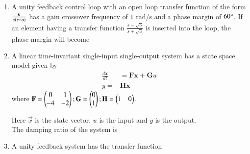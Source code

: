 \documentclass[journal,12pt,onecolumn]{IEEEtran}
\theoremstyle{remark}
\begin{document}
\begin{enumerate}
 

\item A unity feedback control loop with an open loop transfer function of the form $\frac{K}{s\left(s+a\right)}$ has a gain crossover frequency of $1$ rad/s and a phase margin of $60\degree$. If an element having a transfer function $\frac{s-\sqrt{3}}{s+\sqrt{3}}$ is inserted into the loop, the phase margin will become \par \hfill{}
\begin{enumerate}
\end{enumerate} 

 

\item A linear time-invariant single-input single-output system has a state space model given by \\

\begin{align}
  \frac{d\textbf{x}}{dt} & =\textbf{Fx}+\textbf{G}u\\
y= & \textbf{Hx}
\end{align}
where $\textbf{F}= \begin{pmatrix}0&1\\-4&-2\end{pmatrix}
 ; \textbf{G}= \begin{pmatrix}0\\1\end{pmatrix}; \textbf{H}= \begin{pmatrix}1&0\end{pmatrix}$.  

 \par
 Here $\vec{x}$ is the state vector, $u$ is the input and $y$ is the output. \\
The damping ratio of the system is \par \hfill{}
\begin{enumerate}
\end{enumerate} 

 

\item A unity feedback system has the transfer function\par


\end{enumerate}
\end{document}
